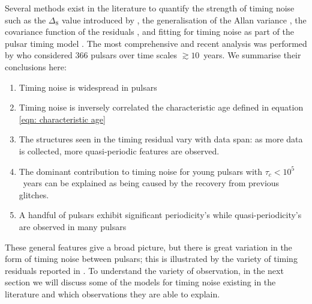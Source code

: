 Several methods exist in the literature to quantify the strength of timing
noise such as the $\Delta_{8}$ value introduced by \citet{Arzoumanian1994}, the
generalisation of the Allan variance \citep{Matsakis1997}, the covariance
function of the residuals \citep{Coles2011}, and fitting for timing noise as
part of the pulsar timing model \citep{Lentati2014}.  The most comprehensive
and recent analysis was performed by \citet{Hobbs2010} who considered 366
pulsars over time scales $\gtrsim10$~years.  We summarise their conclusions
here: \begin{enumerate}

    \item Timing noise is widespread in pulsars

    \item Timing noise is inversely correlated the characteristic age defined
in equation \ref{eqn: characteristic age}

    \item The structures seen in the timing residual vary with data span: as
more data is collected, more quasi-periodic features are observed.

    \item The dominant contribution to timing noise for young pulsars with
$\tau_{c}<10^{5}$~years can be explained as being caused by the recovery from
previous glitches.

    \item A handful of pulsars exhibit significant periodicity's while
quasi-periodicity's are observed in many pulsars

\end{enumerate}

These general features give a broad picture, but there is great variation in
the form of timing noise between pulsars; this is illustrated by the variety of
timing residuals reported in \citet{Hobbs2010}. To understand the variety of
observation, in the next section we will discuss some of the models for timing
noise existing in the literature and which observations they are able to
explain.
